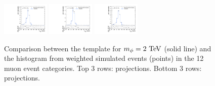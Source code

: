 \begin{figure}[htpb]
  \includegraphics[width=0.2\textwidth]{fig/2Dfit/templateVsReco_VBFRadToWW2000_r0_MJ_mu_LP_vbf_LDy.pdf}
  \includegraphics[width=0.2\textwidth]{fig/2Dfit/templateVsReco_VBFRadToWW2000_r0_MJ_mu_HP_vbf_HDy.pdf}
  \includegraphics[width=0.2\textwidth]{fig/2Dfit/templateVsReco_VBFRadToWW2000_r0_MJ_mu_LP_vbf_HDy.pdf}\\
  \caption{
    Comparison between the \VBF\RadtoWW template for $m_{\Rad}=2\unit{TeV}$ (solid line) and the histogram from weighted simulated events (points) in the 12 muon event categories.
    Top 3 rows: \MVV projections.
    Bottom 3 rows: \MJ projections.
  }
  \label{fig:1dtemplateVsReco_VBFRadToWW2000_Run2}
\end{figure}

